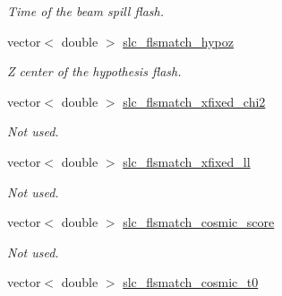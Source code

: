 \begin{DoxyCompactItemize}
\begin{DoxyCompactList}\small\item\em Time of the beam spill flash. \end{DoxyCompactList}\item 
\hypertarget{classUBXSecEvent_a237e3f0d9a59f740ee1725fd7d8186bd}{vector$<$ double $>$ \hyperlink{classUBXSecEvent_a237e3f0d9a59f740ee1725fd7d8186bd}{slc\-\_\-flsmatch\-\_\-hypoz}}\label{classUBXSecEvent_a237e3f0d9a59f740ee1725fd7d8186bd}

\begin{DoxyCompactList}\small\item\em Z center of the hypothesis flash. \end{DoxyCompactList}\item 
\hypertarget{classUBXSecEvent_a51b8f4fca1456ceba66f171ac8e9eb4a}{vector$<$ double $>$ \hyperlink{classUBXSecEvent_a51b8f4fca1456ceba66f171ac8e9eb4a}{slc\-\_\-flsmatch\-\_\-xfixed\-\_\-chi2}}\label{classUBXSecEvent_a51b8f4fca1456ceba66f171ac8e9eb4a}

\begin{DoxyCompactList}\small\item\em Not used. \end{DoxyCompactList}\item 
\hypertarget{classUBXSecEvent_a1bf76c945234f61391ad4d287862f2a8}{vector$<$ double $>$ \hyperlink{classUBXSecEvent_a1bf76c945234f61391ad4d287862f2a8}{slc\-\_\-flsmatch\-\_\-xfixed\-\_\-ll}}\label{classUBXSecEvent_a1bf76c945234f61391ad4d287862f2a8}

\begin{DoxyCompactList}\small\item\em Not used. \end{DoxyCompactList}\item 
\hypertarget{classUBXSecEvent_ad74c03fcc0b57d4084eb05d0f5617b3a}{vector$<$ double $>$ \hyperlink{classUBXSecEvent_ad74c03fcc0b57d4084eb05d0f5617b3a}{slc\-\_\-flsmatch\-\_\-cosmic\-\_\-score}}\label{classUBXSecEvent_ad74c03fcc0b57d4084eb05d0f5617b3a}

\begin{DoxyCompactList}\small\item\em Not used. \end{DoxyCompactList}\item 
\hypertarget{classUBXSecEvent_a645973d4e447d46008828658b826e8f0}{vector$<$ double $>$ \hyperlink{classUBXSecEvent_a645973d4e447d46008828658b826e8f0}{slc\-\_\-flsmatch\-\_\-cosmic\-\_\-t0}}\label{classUBXSecEvent_a645973d4e447d46008828658b826e8f0}


\end{DoxyCompactItemize}
